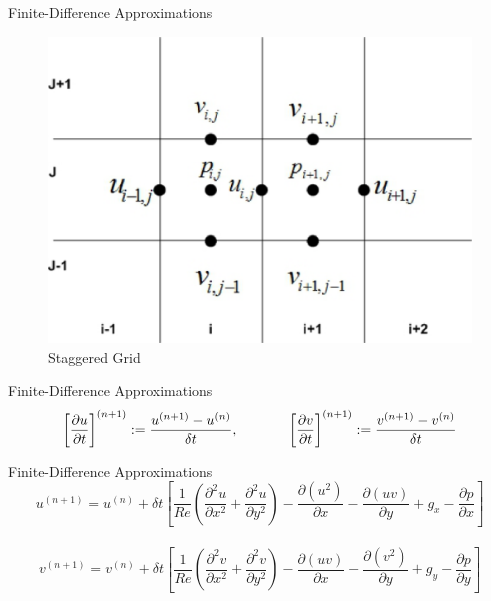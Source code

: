 \documentclass[frames]{prosper}
\begin{document}
\begin{slide}[Dissolve]{Finite-Difference Approximations}
\begin{figure}
\begin{center}
\caption{Staggered Grid}
\label{sg}
\includegraphics[scale = .3]{staggered_grid_marvin.eps}
\end{center}
\end{figure}
\end{slide}

\begin{slide}[Dissolve]{Finite-Difference Approximations}
$$\left[\frac{\partial u}{\partial t}\right]^{(n+1)} := \frac{u^{(n+1)} - u^{(n)}}{\delta t}, \hspace{.5in} \left[\frac{\partial v}{\partial t}\right]^{(n+1)} := \frac{v^{(n+1)} - v^{(n)}}{\delta t}$$
\end{slide}

\begin{slide}[Dissolve]{Finite-Difference Approximations}
$$u^{(n+1)} = u^{(n)} + \delta t\left[\frac{1}{Re}\left(\frac{\partial^2 u}{\partial x^2} + \frac{\partial^2 u}{\partial y^2}\right) - \frac{\partial (u^2)}{\partial x} - \frac{\partial (uv)}{\partial y} + g_{x} - \frac{\partial p}{\partial x}\right]$$\\

$$v^{(n+1)} = v^{(n)} + \delta t\left[\frac{1}{Re}\left(\frac{\partial^2 v}{\partial x^2} + \frac{\partial^2 v}{\partial y^2}\right) - \frac{\partial (uv)}{\partial x} - \frac{\partial (v^2)}{\partial y} + g_{y} - \frac{\partial p}{\partial y}\right]$$
\end{slide}
\end{document}
